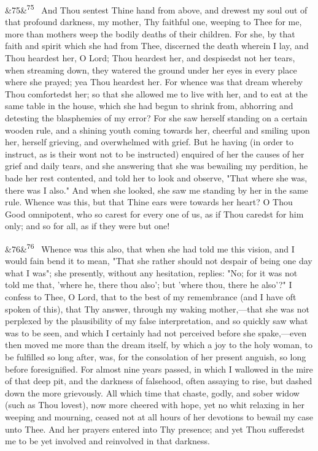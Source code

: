 \documentclass[12pt]{article}
\newcommand{\para}[1][]{\par\noindent\ifx&#1&\else\textsuperscript{\footnotesize #1}~\fi}
\begin{document}
\para[75] And Thou sentest Thine hand from above, and drewest my soul out of that profound darkness, my mother, Thy faithful one, weeping to Thee for me, more than mothers weep the bodily deaths of their children. For she, by that faith and spirit which she had from Thee, discerned the death wherein I lay, and Thou heardest her, O Lord; Thou heardest her, and despisedst not her tears, when streaming down, they watered the ground under her eyes in every place where she prayed; yea Thou heardest her. For whence was that dream whereby Thou comfortedst her; so that she allowed me to live with her, and to eat at the same table in the house, which she had begun to shrink from, abhorring and detesting the blasphemies of my error? For she saw herself standing on a certain wooden rule, and a shining youth coming towards her, cheerful and smiling upon her, herself grieving, and overwhelmed with grief. But he having (in order to instruct, as is their wont not to be instructed) enquired of her the causes of her grief and daily tears, and she answering that she was bewailing my perdition, he bade her rest contented, and told her to look and observe, "That where she was, there was I also." And when she looked, she saw me standing by her in the same rule. Whence was this, but that Thine ears were towards her heart? O Thou Good omnipotent, who so carest for every one of us, as if Thou caredst for him only; and so for all, as if they were but one!

\para[76] Whence was this also, that when she had told me this vision, and I would fain bend it to mean, "That she rather should not despair of being one day what I was"; she presently, without any hesitation, replies: "No; for it was not told me that, 'where he, there thou also'; but 'where thou, there he also'?" I confess to Thee, O Lord, that to the best of my remembrance (and I have oft spoken of this), that Thy answer, through my waking mother,---that she was not perplexed by the plausibility of my false interpretation, and so quickly saw what was to be seen, and which I certainly had not perceived before she spake,---even then moved me more than the dream itself, by which a joy to the holy woman, to be fulfilled so long after, was, for the consolation of her present anguish, so long before foresignified. For almost nine years passed, in which I wallowed in the mire of that deep pit, and the darkness of falsehood, often assaying to rise, but dashed down the more grievously. All which time that chaste, godly, and sober widow (such as Thou lovest), now more cheered with hope, yet no whit relaxing in her weeping and mourning, ceased not at all hours of her devotions to bewail my case unto Thee. And her prayers entered into Thy presence; and yet Thou sufferedst me to be yet involved and reinvolved in that darkness.
\end{document}
